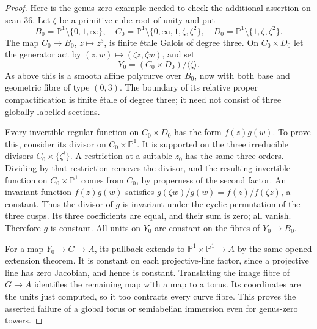 \begin{proof}
Here is the genus-zero example needed to check the additional assertion
on scan 36. Let $\zeta$ be a primitive cube root of unity and put
\[
 B_0=\mathbb P^1\setminus\{0,1,\infty\},\quad
 C_0=\mathbb P^1\setminus\{0,\infty,1,\zeta,\zeta^2\},\quad
 D_0=\mathbb P^1\setminus\{1,\zeta,\zeta^2\}.
\]
The map $C_0\to B_0$, $z\mapsto z^3$, is finite \'etale Galois
of degree three. On $C_0\times D_0$ let the generator act by
$(z,w)\mapsto(\zeta z,\zeta w)$, and set
\[
             Y_0=(C_0\times D_0)/\langle\zeta\rangle.
\]
As above this is a smooth affine polycurve over $B_0$, now with
both base and geometric fibre of type $(0,3)$. The boundary of its
relative proper compactification is finite \'etale of degree three;
it need not consist of three globally labelled sections.

Every invertible regular function on $C_0\times D_0$ has the form
$f(z)g(w)$. To prove this, consider its divisor on $C_0\times\mathbb P^1$.
It is supported on the three irreducible divisors $C_0\times\{\zeta^i\}$.
A restriction at a suitable $z_0$ has the same three orders. Dividing
by that restriction removes the divisor, and the resulting invertible
function on $C_0\times\mathbb P^1$ comes from $C_0$, by properness
of the second factor. An invariant function $f(z)g(w)$ satisfies
$g(\zeta w)/g(w)=f(z)/f(\zeta z)$, a constant. Thus the divisor
of $g$ is invariant under the cyclic permutation of the three cusps.
Its three coefficients are equal, and their sum is zero; all vanish.
Therefore $g$ is constant. All units on $Y_0$ are constant on the fibres
of $Y_0\to B_0$.

For a map $Y_0\to G\to A$, its pullback extends to
$\mathbb P^1\times\mathbb P^1\to A$ by the same opened extension
theorem. It is constant on each projective-line factor, since a
projective line has zero Jacobian, and hence is constant. Translating
the image fibre of $G\to A$ identifies the remaining map with a map
to a torus. Its coordinates are the units just computed, so it too
contracts every curve fibre. This proves the asserted failure of a
global torus or semiabelian immersion even for genus-zero towers.
\end{proof}

